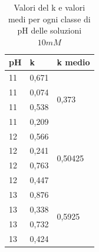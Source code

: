 \begin{table}
\caption{Valori del k e valori medi per ogni classe di pH delle soluzioni $10mM$}
\begin{center}
\begin{tabular}{lll}
\textbf{pH} & \textbf{k}     & \textbf{k medio} \\ \hline
11 & 0,671 & \multirow{4}{*}{0,373}   \\
11 & 0,074 &                          \\
11 & 0,538 &                          \\
11 & 0,209 &                          \\ \hline
12 & 0,566 & \multirow{4}{*}{0,50425} \\
12 & 0,241 &                          \\
12 & 0,763 &                          \\
12 & 0,447 &                          \\ \hline
13 & 0,876 & \multirow{4}{*}{0,5925}  \\
13 & 0,338 &                          \\
13 & 0,732 &                          \\
13 & 0,424 & 
\end{tabular}
\end{center}
\end{table}
\pagebreak

